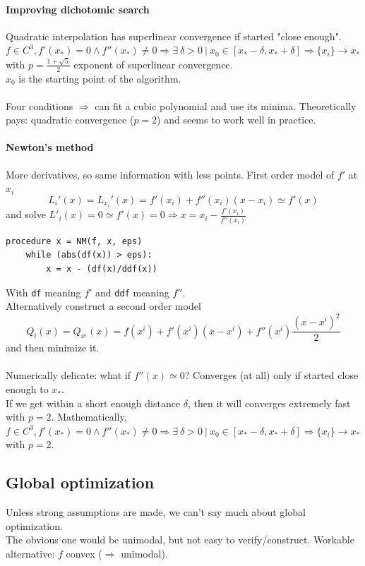 \documentclass[10pt]{report}
\begin{document}
\paragraph{Improving dichotomic search} Quadratic interpolation has superlinear convergence if started "close enough".\\
$f\in C^3, f'(x_*) = 0 \wedge f''(x_*)\neq 0 \Rightarrow \exists\:\delta > 0\:|\:x_0 \in [x_* - \delta, x_* + \delta] \Rightarrow \{x_i\} \rightarrow x_*$ with $p = \frac{1 + \sqrt{5}}{2}$ exponent of superlinear convergence.\\$x_0$ is the starting point of the algorithm.\\\\
Four conditions $\Rightarrow$ can fit a cubic polynomial and use its minima. Theoretically pays: quadratic convergence ($p = 2$) and seems to work well in practice.
\paragraph{Newton's method} More derivatives, so same information with less points. First order model of $f'$ at $x_i$ $$L_i'(x) = L_{x_i}'(x) = f'(x_i) + f''(x_i)(x-x_i)\simeq f'(x)$$ and solve $L'_i(x) = 0 \simeq f'(x) = 0 \Rightarrow x = x_i-\frac{f'(x_i)}{f''(x_i)}$
\begin{lstlisting}[style=myPython]
procedure x = NM(f, x, eps)
	while (abs(df(x)) > eps):
		x = x - (df(x)/ddf(x))
\end{lstlisting}
With \texttt{df} meaning $f'$ and \texttt{ddf} meaning $f''$.\\
Alternatively construct a second order model $$Q_i(x) = Q_{x^i}(x) = f(x^i) + f'(x^i)(x - x^i) + f''(x^i)\frac{(x - x^i)^2}{2}$$ and then minimize it.\\\\
Numerically delicate: what if $f''(x) \simeq 0$? Converges (at all) only if started close enough to $x_*$.\\
If we get within a short enough distance $\delta$, then it will converges extremely fast with $p = 2$. Mathematically, $f\in C^3, f'(x_*) = 0 \wedge f''(x_*)\neq 0\Rightarrow \exists\:\delta>0\:|\:x_0\in[x_*-\delta, x_*+\delta]\Rightarrow \{x_i\} \rightarrow x_*$ with $p = 2$.

\subsection{Global optimization} Unless strong assumptions are made, we can't say much about global optimization.\\
The obvious one would be unimodal, but not easy to verify/construct. Workable alternative: $f$ convex ($\Rightarrow$ unimodal).
\end{document}
